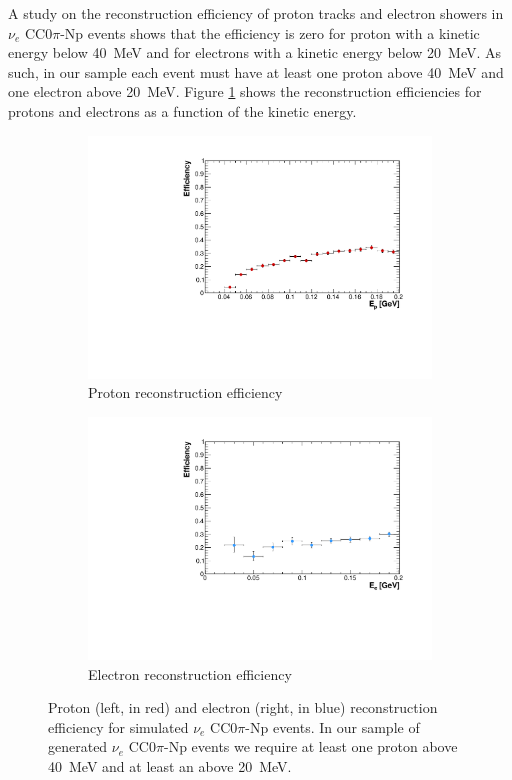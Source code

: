 A study on the reconstruction efficiency of proton tracks and electron showers in $\nu_{e}$ CC$0\pi$-Np events shows that the efficiency is zero for proton with a kinetic energy below 40~MeV and for electrons with a kinetic energy below 20~MeV. As such, in our sample each event must have at least one proton above 40~MeV and one electron above 20~MeV. Figure \ref{fig:kin_eff} shows the reconstruction efficiencies for protons and electrons as a function of the kinetic energy.

\begin{figure}[htbp]
  \begin{subfigure}{0.48\textwidth}
    \includegraphics[width=\linewidth]{figures/proton_eff.pdf}
    \caption{Proton reconstruction efficiency} 
  \end{subfigure}
    \begin{subfigure}{0.48\textwidth}
    \includegraphics[width=\linewidth]{figures/electron_eff.pdf}
    \caption{Electron reconstruction efficiency} 
  \end{subfigure}
  \caption{Proton (left, in red) and electron (right, in blue) reconstruction efficiency for simulated $\nu_{e}$ CC$0\pi$-Np events. In our sample of generated $\nu_{e}$ CC$0\pi$-Np events we require at least one proton above 40~MeV and at least an above 20~MeV.}
  \label{fig:kin_eff}
\end{figure}


